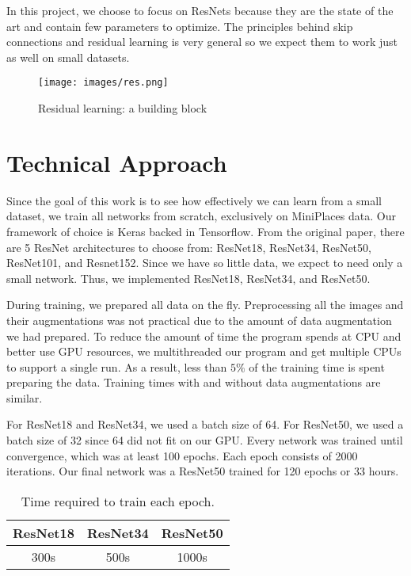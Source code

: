 \documentclass[10pt,twocolumn,letterpaper]{article}
\begin{document}
In this project, we choose to focus on ResNets because they are the state of the art and contain few parameters to optimize. The principles behind skip connections and residual learning is very general so we expect them to work just as well on small datasets.

\begin{figure}[t]
\begin{center}
\texttt{[image: images/res.png]}
\end{center}
   \caption{Residual learning: a building block}
\label{fig:long}
\label{fig:onecol}
\end{figure}


\section{Technical Approach}
Since the goal of this work is to see how effectively we can learn from a small dataset, we train all networks from scratch, exclusively on MiniPlaces data. Our framework of choice is Keras backed in Tensorflow. From the original paper, there are 5 ResNet architectures to choose from: ResNet18, ResNet34, ResNet50, ResNet101, and Resnet152. Since we have so little data, we expect to need only a small network. Thus, we implemented ResNet18, ResNet34, and ResNet50.

During training, we prepared all data on the fly. Preprocessing all the images and their augmentations was not practical due to the amount of data augmentation we had prepared. To reduce the amount of time the program spends at CPU and better use GPU resources, we multithreaded our program and get multiple CPUs to support a single run. As a result, less than $5\%$ of the training time is spent preparing the data. Training times with and without data augmentations are similar.

For ResNet18 and ResNet34, we used a batch size of 64. For ResNet50, we used a batch size of 32 since 64 did not fit on our GPU. Every network was trained until convergence, which was at least 100 epochs. Each epoch consists of 2000 iterations. Our final network was a ResNet50 trained for 120 epochs or 33 hours.

\begin{table}[h]
\centering
 \begin{tabular}{||c c c||} 
 \hline
 ResNet18 & ResNet34 & ResNet50 \\ [0.5ex] 
 \hline\hline
 300s & 500s & 1000s \\ [1ex] 
 \hline
\end{tabular}
\smallskip
\caption{Time required to train each epoch.}
\label{table:1}
\end{table}
\end{document}
